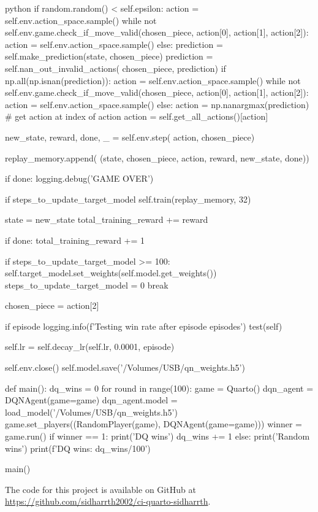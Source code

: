 \begin{mintedbox}{python}
                if random.random() < self.epsilon:
                    action = self.env.action_space.sample()
                    while not self.env.game.check_if_move_valid(chosen_piece, action[0], action[1], action[2]):
                        action = self.env.action_space.sample()
                else:
                    prediction = self.make_prediction(state, chosen_piece)
                    prediction = self.nan_out_invalid_actions(
                        chosen_piece, prediction)
                    if np.all(np.isnan(prediction)):
                        action = self.env.action_space.sample()
                        while not self.env.game.check_if_move_valid(chosen_piece, action[0], action[1], action[2]):
                            action = self.env.action_space.sample()
                    else:
                        action = np.nanargmax(prediction)
                        # get action at index of action
                        action = self.get_all_actions()[action]

                new_state, reward, done, _ = self.env.step(
                    action, chosen_piece)

                replay_memory.append(
                    (state, chosen_piece, action, reward, new_state, done))

                if done:
                    logging.debug('GAME OVER')

                if steps_to_update_target_model %
                    self.train(replay_memory, 32)

                state = new_state
                total_training_reward += reward

                if done:
                    total_training_reward += 1

                    if steps_to_update_target_model >= 100:
                        self.target_model.set_weights(self.model.get_weights())
                        steps_to_update_target_model = 0
                    break

                chosen_piece = action[2]

            if episode %
                logging.info(f'Testing win rate after {episode} episodes')
                test(self)

            self.lr = self.decay_lr(self.lr, 0.0001, episode)

        self.env.close()
        self.model.save('/Volumes/USB/qn_weights.h5')

def main():
    dq_wins = 0
    for round in range(100):
        game = Quarto()
        dqn_agent = DQNAgent(game=game)
        dqn_agent.model = load_model('/Volumes/USB/qn_weights.h5')
        game.set_players((RandomPlayer(game), DQNAgent(game=game)))
        winner = game.run()
        if winner == 1:
            print('DQ wins')
            dq_wins += 1
        else:
            print('Random wins')
    print(f'DQ wins: {dq_wins/100}')

main()
\end{mintedbox}

The code for this project is available on GitHub at \url{https://github.com/sidharrth2002/ci-quarto-sidharrth}.


